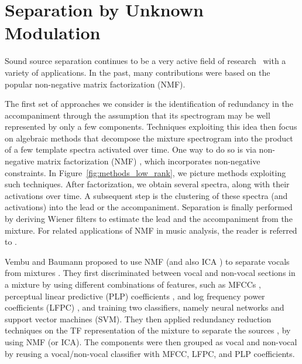 \chapter{Separation by Unknown Modulation}
\label{cha:unknown}



Sound source separation continues to be a very active field of research~\cite{vincent14} with a variety of applications. In the past, many contributions were based on the popular non-negative matrix factorization (NMF).

The first set of approaches we consider is the identification of redundancy in the accompaniment through the assumption that its spectrogram may be well represented by only a few components. Techniques exploiting this idea then focus on algebraic methods that decompose the mixture spectrogram into the product of a few template spectra activated over time. One way to do so is via non-negative matrix factorization (NMF) \cite{lee99,lee01}, which incorporates non-negative constraints. In Figure~\ref{fig:methods_low_rank}, we picture methods exploiting such techniques. After factorization, we obtain several spectra, along with their activations over time. A subsequent step is the clustering of these spectra (and activations) into the lead or the accompaniment. Separation is finally performed by deriving Wiener filters to estimate the lead and the accompaniment from the mixture. For related applications of NMF in music analysis, the reader is referred to \cite{smaragdis03,virtanen07,fevotte09}.

Vembu and Baumann proposed to use NMF (and also ICA \cite{common94}) to separate vocals from mixtures \cite{vembu05}. They first discriminated between vocal and non-vocal sections in a mixture by using different combinations of features, such as MFCCs \cite{david80}, perceptual linear predictive (PLP) coefficients \cite{hermansky90}, and log frequency power coefficients (LFPC) \cite{nwe04}, and training two classifiers, namely neural networks and support vector machines (SVM). They then applied redundancy reduction techniques on the TF representation of the mixture to separate the sources \cite{casey00}, by using NMF (or ICA). The components were then grouped as vocal and non-vocal by reusing a vocal/non-vocal classifier with MFCC, LFPC, and PLP coefficients.

